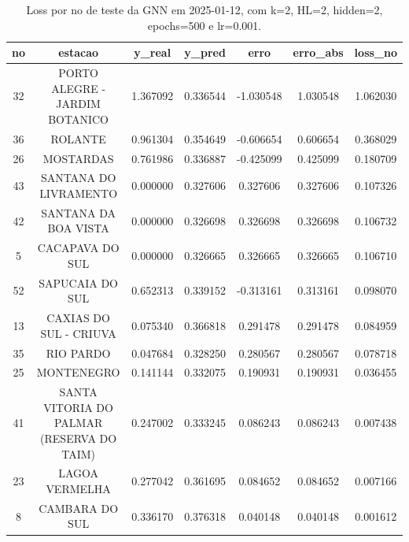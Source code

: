 \begin{table}[h]
\centering
\caption{Loss por no de teste da GNN em 2025-01-12, com k=2, HL=2, hidden=2, epochs=500 e lr=0.001.}
\label{tab:gnn_loss_k2_hl2_h2_e500_d20250112}
\begin{tabular}{ccccccc}
\toprule
no & estacao & y\_real & y\_pred & erro & erro\_abs & loss\_no \\
\midrule
32 & PORTO ALEGRE - JARDIM BOTANICO & 1.367092 & 0.336544 & -1.030548 & 1.030548 & 1.062030 \\
36 & ROLANTE & 0.961304 & 0.354649 & -0.606654 & 0.606654 & 0.368029 \\
26 & MOSTARDAS & 0.761986 & 0.336887 & -0.425099 & 0.425099 & 0.180709 \\
43 & SANTANA DO LIVRAMENTO & 0.000000 & 0.327606 & 0.327606 & 0.327606 & 0.107326 \\
42 & SANTANA DA BOA VISTA & 0.000000 & 0.326698 & 0.326698 & 0.326698 & 0.106732 \\
5 & CACAPAVA DO SUL & 0.000000 & 0.326665 & 0.326665 & 0.326665 & 0.106710 \\
52 & SAPUCAIA DO SUL & 0.652313 & 0.339152 & -0.313161 & 0.313161 & 0.098070 \\
13 & CAXIAS DO SUL - CRIUVA & 0.075340 & 0.366818 & 0.291478 & 0.291478 & 0.084959 \\
35 & RIO PARDO & 0.047684 & 0.328250 & 0.280567 & 0.280567 & 0.078718 \\
25 & MONTENEGRO & 0.141144 & 0.332075 & 0.190931 & 0.190931 & 0.036455 \\
41 & SANTA VITORIA DO PALMAR (RESERVA DO TAIM) & 0.247002 & 0.333245 & 0.086243 & 0.086243 & 0.007438 \\
23 & LAGOA VERMELHA & 0.277042 & 0.361695 & 0.084652 & 0.084652 & 0.007166 \\
8 & CAMBARA DO SUL & 0.336170 & 0.376318 & 0.040148 & 0.040148 & 0.001612 \\
\bottomrule
\end{tabular}
\end{table}
